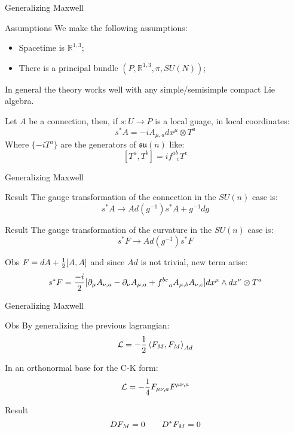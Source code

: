 \documentclass{beamer}
\begin{document}
\begin{frame}{Generalizing Maxwell}
	\begin{exampleblock}{Assumptions}
	We make the following assumptions:
	\begin{itemize}
		\item Spacetime is $\mathbb{R}^{1,3}$;
		\item There is a principal bundle $(P,\mathbb{R}^{1,3},\pi,SU(N))$;
	\end{itemize}
	In general the theory works well with any simple/semisimple compact Lie algebra.
\end{exampleblock}
Let $A$ be a connection, then, if $s:U\rightarrow P$ is a local guage, in local coordinates:
$$s^*A=-iA_{\mu,a} dx^\mu\otimes T^a$$
Where $\{-iT^a\}$ are the generators of $\mathfrak{su}(n)$ like: $$[T^a,T^b]=if^{ab}_{\hspace{9pt}c}T^c$$
\end{frame}
\begin{frame}{Generalizing Maxwell}
	\begin{block}{Result}
		The gauge transformation of the connection in the $SU(n)$ case is:
		$$s^*A\rightarrow Ad(g^{-1})s^*A+g^{-1}dg$$
	\end{block}
	\begin{block}{Result}
		The gauge transformation of the curvature in the $SU(n)$ case is:
		$$s^*F\rightarrow Ad(g^{-1})s^*F$$
	\end{block}
	\begin{exampleblock}{Obs}
		$F=dA+{1\over 2}[A,A]$ and since $Ad$ is not trivial, new term arise:
		$$s^*F={-i\over 2}[\partial_{\mu}A_{\nu,a}-\partial_{\nu}A_{\mu,a}+f^{bc}_{\hspace{9pt}a}A_{\mu,b}A_{\nu,c}]dx^\mu\wedge dx^\nu \otimes T^a$$
	\end{exampleblock}
\end{frame}
\begin{frame}{Generalizing Maxwell}
	\begin{exampleblock}{Obs}
		By generalizing the previous lagrangian:
		$$\mathcal{L}=-{1\over 2}\braket{F_M,F_M}_{Ad}$$
	\end{exampleblock}
	In an orthonormal base for the C-K form:
	$$\mathcal{L}=-{1\over 4}F_{\mu\nu,a}F^{\mu\nu,a}$$
	\begin{block}{Result}
		$$DF_M=0\hspace{20 pt} D^*F_M=0$$
	\end{block}
\end{frame}
\end{document}
